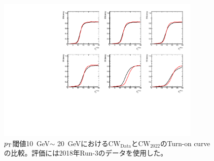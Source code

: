 \begin{figure}[htb]
  \centering
  \includegraphics[clip, width=10cm]{fig/5/v05v06_10_15.pdf}
  \caption{$p_{\rm{T}}$閾値10~GeV$\sim$ 20~GeVにおける$\mathrm{CW_{Data}}$と$\mathrm{CW_{2022}}$のTurn-on curveの比較。評価には2018年Run-3のデータを使用した。}
  \label{fig:v05v06_10_15_Data}
\end{figure}

